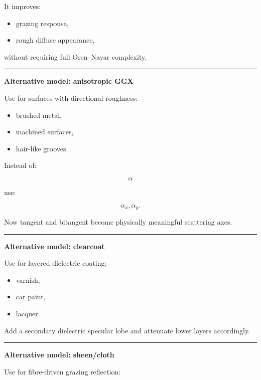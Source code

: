 It improves:

\begin{itemize}
\tightlist
\item
  grazing response,
\item
  rough diffuse appearance,
\end{itemize}

without requiring full Oren--Nayar complexity.

\begin{center}\rule{0.5\linewidth}{0.5pt}\end{center}

\textbf{Alternative model: anisotropic GGX}

Use for surfaces with directional roughness:

\begin{itemize}
\tightlist
\item
  brushed metal,
\item
  machined surfaces,
\item
  hair-like grooves.
\end{itemize}

Instead of:

\[
\alpha
\]

use:

\[
\alpha_x,\alpha_y.
\]

Now tangent and bitangent become physically meaningful scattering axes.

\begin{center}\rule{0.5\linewidth}{0.5pt}\end{center}

\textbf{Alternative model: clearcoat}

Use for layered dielectric coating:

\begin{itemize}
\tightlist
\item
  varnish,
\item
  car paint,
\item
  lacquer.
\end{itemize}

Add a secondary dielectric specular lobe and attenuate lower layers accordingly.

\begin{center}\rule{0.5\linewidth}{0.5pt}\end{center}

\textbf{Alternative model: sheen/cloth}

Use for fibre-driven grazing reflection:


